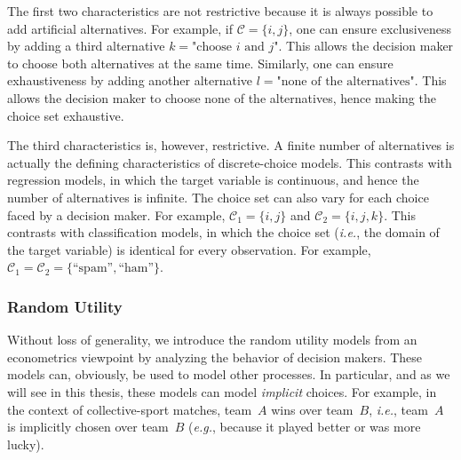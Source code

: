 The first two characteristics are not restrictive because it is always possible to add artificial alternatives.
For example, if $\mathcal{C} = \{i, j\}$, one can ensure exclusiveness by adding a third alternative $k = \text{"choose $i$ and $j$"}$.
This allows the decision maker to choose both alternatives at the same time.
Similarly, one can ensure exhaustiveness by adding another alternative $l = \text{"none of the alternatives"}$.
This allows the decision maker to choose none of the alternatives, hence making the choice set exhaustive.

The third characteristics is, however, restrictive.
A finite number of alternatives is actually the defining characteristics of discrete-choice models.
This contrasts with regression models, in which the target variable is continuous, and hence the number of alternatives is infinite.
The choice set can also vary for each choice faced by a decision maker.
For example, $\mathcal{C}_1 = \{ i, j \}$ and $\mathcal{C}_2 = \{ i, j, k \}$.
This contrasts with classification models, in which the choice set (\textit{i.e.}, the domain of the target variable) is identical for every observation.
For example, $\mathcal{C}_1 = \mathcal{C}_2 = \{ \text{``spam''}, \text{``ham''} \}$.

\subsubsection{Random Utility}

Without loss of generality, we introduce the random utility models from an econometrics viewpoint by analyzing the behavior of decision makers.
These models can, obviously, be used to model other processes.
In particular, and as we will see in this thesis, these models can model \emph{implicit} choices.
For example, in the context of collective-sport matches, team~$A$ wins over team~$B$, \textit{i.e.}, team~$A$ is implicitly chosen over team~$B$ (\textit{e.g.}, because it played better or was more lucky).

